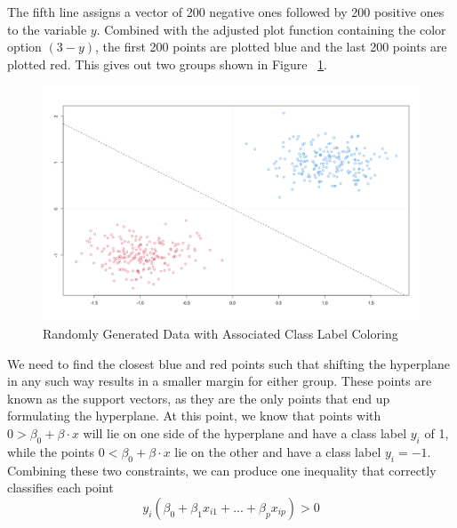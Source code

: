 \documentclass[12pt]{article}
\begin{document}
The fifth line assigns a vector of 200 negative ones followed by 200 positive ones to the variable $y$. Combined with the adjusted plot function containing the color option $(3-y)$, the first 200 points are plotted blue and the last 200 points are plotted red. This gives out two groups shown in Figure ~\ref{fig_mmc_hyperplane_w_labels}.
\begin{figure}
    \centering
    \includegraphics[width=5.5in]{Figures/mmc_hyperplane_w_labels.png}
    \caption{Randomly Generated Data with Associated Class Label Coloring}
    \label{fig_mmc_hyperplane_w_labels}
\end{figure}
We need to find the closest blue and red points such that shifting the hyperplane in any such way results in a smaller margin for either group. These points are known as the support vectors, as they are the only points that end up formulating the hyperplane. At this point, we know that points with $0>\beta_0 + \beta \cdot x$ will lie on one side of the hyperplane and have a class label $y_i$ of 1, while the points $0<\beta_0 + \beta \cdot x$ lie on the other and have a class label $y_i=-1$. Combining these two constraints, we can produce one inequality that correctly classifies each point
$$y_i(\beta_0+\beta_1x_{i1}+...+\beta_px_{ip})>0$$
\end{document}
